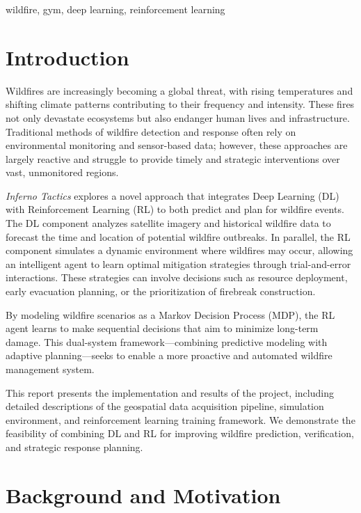 \documentclass[conference]{IEEEtran}
\begin{document}
\begin{IEEEkeywords}
wildfire, gym, deep learning, reinforcement learning
\end{IEEEkeywords}

\section{Introduction}

Wildfires are increasingly becoming a global threat, with rising temperatures and shifting climate patterns contributing to their frequency and intensity. These fires not only devastate ecosystems but also endanger human lives and infrastructure. Traditional methods of wildfire detection and response often rely on environmental monitoring and sensor-based data; however, these approaches are largely reactive and struggle to provide timely and strategic interventions over vast, unmonitored regions.

\noindent
\textit{Inferno Tactics} explores a novel approach that integrates Deep Learning (DL) with Reinforcement Learning (RL) to both predict and plan for wildfire events. The DL component analyzes satellite imagery and historical wildfire data to forecast the time and location of potential wildfire outbreaks. In parallel, the RL component simulates a dynamic environment where wildfires may occur, allowing an intelligent agent to learn optimal mitigation strategies through trial-and-error interactions. These strategies can involve decisions such as resource deployment, early evacuation planning, or the prioritization of firebreak construction.

\noindent
By modeling wildfire scenarios as a Markov Decision Process (MDP), the RL agent learns to make sequential decisions that aim to minimize long-term damage. This dual-system framework—combining predictive modeling with adaptive planning—seeks to enable a more proactive and automated wildfire management system.

\noindent
This report presents the implementation and results of the project, including detailed descriptions of the geospatial data acquisition pipeline, simulation environment, and reinforcement learning training framework. We demonstrate the feasibility of combining DL and RL for improving wildfire prediction, verification, and strategic response planning.

\section{Background and Motivation}
\end{document}
